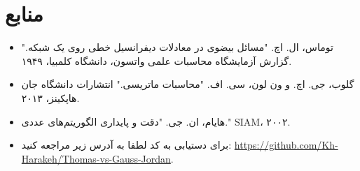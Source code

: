 \documentclass[a4paper,12pt]{article}
\begin{document}
\section*{منابع}
\begin{itemize}
    \item توماس، ال. اچ. "مسائل بیضوی در معادلات دیفرانسیل خطی روی یک شبکه." گزارش آزمایشگاه محاسبات علمی واتسون، دانشگاه کلمبیا، ۱۹۴۹.
    \item گلوب، جی. اچ. و ون لون، سی. اف. "محاسبات ماتریسی." انتشارات دانشگاه جان هاپکینز، ۲۰۱۳.
    \item هایام، ان. جی. "دقت و پایداری الگوریتم‌های عددی." SIAM، ۲۰۰۲.
    \item برای دستیابی به کد لطفا به آدرس زیر مراجعه کنید: \url{https://github.com/Kh-Harakeh/Thomas-vs-Gauss-Jordan}.
\end{itemize}
\end{document}
